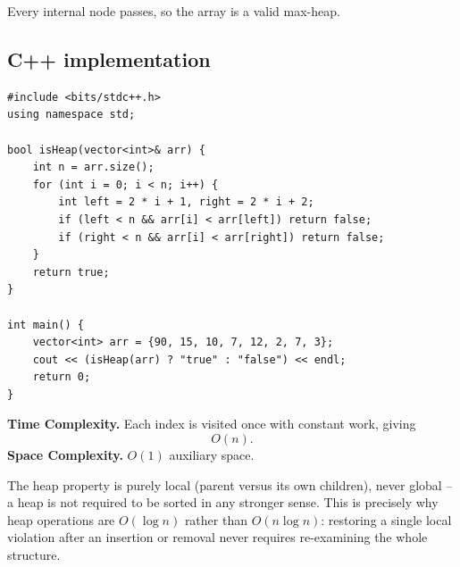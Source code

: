 Every internal node passes, so the array is a valid max-heap.

\subsection*{C++ implementation}

\begin{lstlisting}
#include <bits/stdc++.h>
using namespace std;

bool isHeap(vector<int>& arr) {
    int n = arr.size();
    for (int i = 0; i < n; i++) {
        int left = 2 * i + 1, right = 2 * i + 2;
        if (left < n && arr[i] < arr[left]) return false;
        if (right < n && arr[i] < arr[right]) return false;
    }
    return true;
}

int main() {
    vector<int> arr = {90, 15, 10, 7, 12, 2, 7, 3};
    cout << (isHeap(arr) ? "true" : "false") << endl;
    return 0;
}
\end{lstlisting}

\begin{complexitybox}
\textbf{Time Complexity.} Each index is visited once with constant work,
giving
\[
  O(n).
\]
\textbf{Space Complexity.} $O(1)$ auxiliary space.
\end{complexitybox}

\begin{takeawaybox}
The heap property is purely local (parent versus its own children), never
global -- a heap is not required to be sorted in any stronger sense. This
is precisely why heap operations are $O(\log n)$ rather than $O(n \log n)$:
restoring a single local violation after an insertion or removal never
requires re-examining the whole structure.
\end{takeawaybox}
